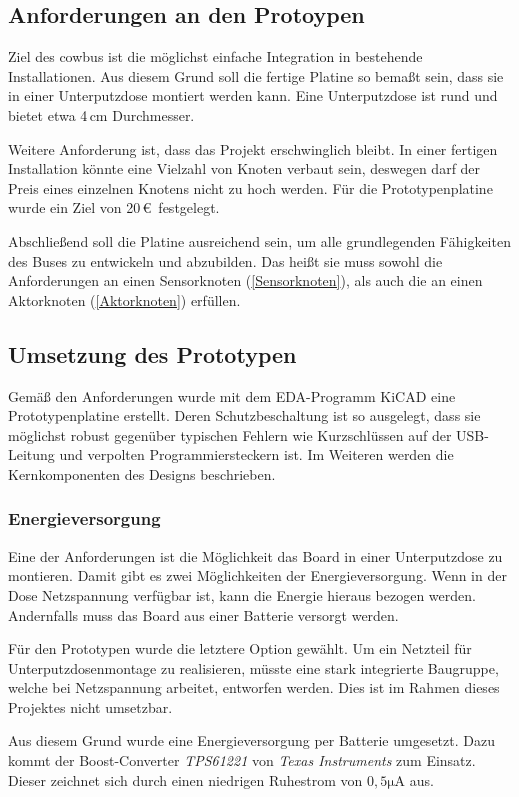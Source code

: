 \documentclass{IEEEtran}
\begin{document}
\subsection{Anforderungen an den Protoypen}
Ziel des cowbus ist die möglichst einfache Integration in bestehende Installationen.
Aus diesem Grund soll die fertige Platine so bemaßt sein, dass sie in einer Unterputzdose montiert werden kann.
Eine Unterputzdose ist rund und bietet etwa 4\,cm Durchmesser.

Weitere Anforderung ist, dass das Projekt erschwinglich bleibt.
In einer fertigen Installation könnte eine Vielzahl von Knoten verbaut sein, deswegen darf der Preis eines einzelnen Knotens nicht zu hoch werden.
Für die Prototypenplatine wurde ein Ziel von 20\,\euro\ festgelegt.

Abschließend soll die Platine ausreichend sein, um alle grundlegenden Fähigkeiten des Buses zu entwickeln und abzubilden.
Das heißt sie muss sowohl die Anforderungen an einen Sensorknoten (\ref{Sensorknoten}), als auch die an einen Aktorknoten (\ref{Aktorknoten}) erfüllen.

\subsection{Umsetzung des Prototypen}
Gemäß den Anforderungen wurde mit dem EDA-Programm KiCAD eine Prototypenplatine erstellt.
Deren Schutzbeschaltung ist so ausgelegt, dass sie möglichst robust gegenüber typischen Fehlern wie Kurzschlüssen auf der USB-Leitung und verpolten Programmiersteckern ist.
Im Weiteren werden die Kernkomponenten des Designs beschrieben.

\subsubsection{Energieversorgung}
Eine der Anforderungen ist die Möglichkeit das Board in einer Unterputzdose zu montieren.
Damit gibt es zwei Möglichkeiten der Energieversorgung.
Wenn in der Dose Netzspannung verfügbar ist, kann die Energie hieraus bezogen werden.
Andernfalls muss das Board aus einer Batterie versorgt werden.

Für den Prototypen wurde die letztere Option gewählt.
Um ein Netzteil für Unterputzdosenmontage zu realisieren, müsste eine stark integrierte Baugruppe, welche bei Netzspannung arbeitet, entworfen werden.
Dies ist im Rahmen dieses Projektes nicht umsetzbar.

Aus diesem Grund wurde eine Energieversorgung per Batterie umgesetzt.
Dazu kommt der Boost-Converter \emph{TPS61221} von \emph{Texas Instruments} zum Einsatz.
Dieser zeichnet sich durch einen niedrigen Ruhestrom von $0,5 \mathrm{\mu A}$ aus.
\end{document}
